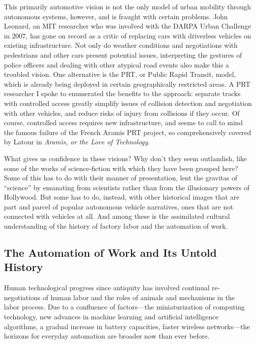 This primarily automotive vision is not the only model of urban
mobility through autonomous systems, however, and is fraught with
certain problems. John Leonard, an MIT researcher who was involved
with the DARPA Urban Challenge in 2007, has gone on record as a critic
of replacing cars with driverless vehicles on existing infrastructure.
Not only do weather conditions and negotiations with pedestrians and
other cars present potential issues, interpreting the gestures of
police officers and dealing with other atypical road events also make
this a troubled vision. One alternative is the PRT, or Public Rapid
Transit, model, which is already being deployed in certain
geographically restricted areas. A PRT researcher I spoke to
enumerated the benefits to the approach: separate tracks with
controlled access greatly simplify issues of collision detection and
negotiation with other vehicles, and reduce risks of injury from collisions if
they occur. Of course, controlled access requires new infrastructure,
and seems to call to mind the famous failure of the French Aramis PRT
project, so comprehensively covered by Latour in \emph{Aramis, or the
  Love of Technology}. 

What gives us confidence in these visions? Why don't they seem
outlandish, like some of the works of science-fiction with which they have
been grouped here? Some of this has to do with their manner of
presentation, lent the gravitas of ``science'' by emanating from
scientists rather than from the
illusionary powers of Hollywood. But some has to do, instead, with other historical images
that are part and parcel of
popular autonomous vehicle narratives, ones that are not connected
with vehicles at all. And among these is the assimilated cultural
understanding of the history of factory labor and the automation of
work.


\subsection{The Automation of Work and Its Untold History}

Human technological progress since antiquity has
involved continual re-negotiations of human labor and the roles of
animals and mechanisms in the labor process. Due to a confluence
of factors---the miniaturization of computing technology, new
advances in machine learning and artificial intelligence algorithms, a
gradual increase in battery capacities, faster wireless networks---the
horizons for everyday automation are broader now than ever before. 

